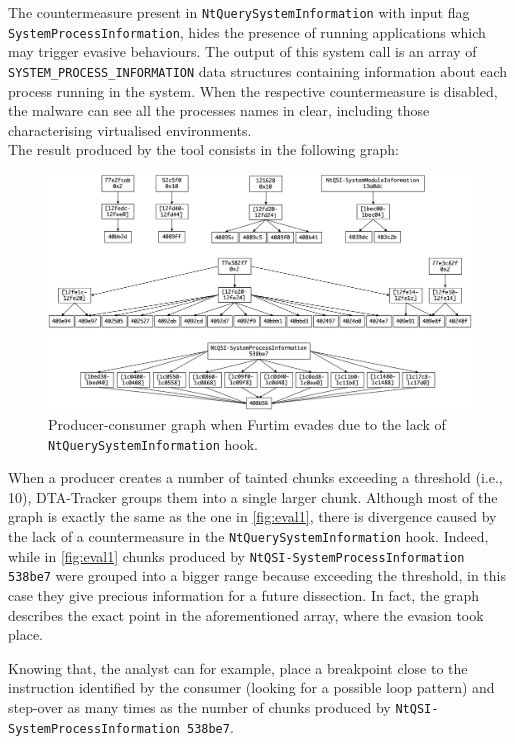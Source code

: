 \documentclass[LaM,binding=0.6cm]{sapthesis}
\begin{document}
The countermeasure present in \texttt{NtQuerySystemInformation} with input flag \texttt{SystemProcessInformation}, hides the presence of running applications which may trigger evasive behaviours. The output of this system call is an array of \texttt{SYSTEM\_PROCESS\_INFORMATION} data structures containing information about each process running in the system. When the respective countermeasure is disabled, the malware can see all the processes names in clear, including those characterising virtualised environments.\\

\noindent The result produced by the tool consists in the following graph:

\begin{figure}[h!]
\centering%
\includegraphics[width=\textwidth]{images/eval2_def}
\caption{Producer-consumer graph when Furtim evades due to the lack of \texttt{NtQuerySystemInformation} hook.}
\end{figure}

\noindent
When a producer creates a number of tainted chunks exceeding a threshold (i.e., 10), {\sf DTA-Tracker} groups them into a single larger chunk. Although most of the graph is exactly the same as the one in \autoref{fig:eval1}, there is divergence caused by the lack of a countermeasure in the \texttt{NtQuerySystemInformation} hook. Indeed, while in \autoref{fig:eval1} chunks produced by \texttt{NtQSI-SystemProcessInformation 538be7} were grouped into a bigger range because exceeding the threshold, in this case they give precious information for a future dissection. In fact, the graph describes the exact point in the aforementioned array, where the evasion took place.
 
Knowing that, the analyst can for example, place a breakpoint close to the instruction identified by the consumer (looking for a possible loop pattern) and step-over as many times as the number of chunks produced by \texttt{NtQSI-SystemProcessInformation 538be7}.\\
\end{document}
